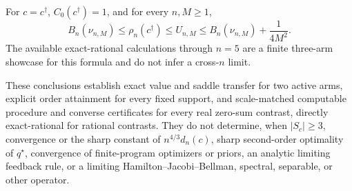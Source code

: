 For \(c=c^\dagger\), \(C_0(c^\dagger)=1\), and for every \(n,M\geq1\),
\[
 B_n(\nu_{n,M})\leq\rho_n(c^\dagger)\leq U_{n,M}
 \leq B_n(\nu_{n,M})+\frac1{4M^2}.
\]
The available exact-rational calculations through \(n=5\) are a finite three-arm showcase for this formula and do not infer a cross-\(n\) limit.

These conclusions establish exact value and saddle transfer for two active arms, explicit order attainment for every fixed support, and scale-matched computable procedure and converse certificates for every real zero-sum contrast, directly exact-rational for rational contrasts. They do not determine, when \(|S_c|\geq3\), convergence or the sharp constant of \(n^{4/3}d_n(c)\), sharp second-order optimality of \(q^\star\), convergence of finite-program optimizers or priors, an analytic limiting feedback rule, or a limiting Hamilton--Jacobi--Bellman, spectral, separable, or other operator.
